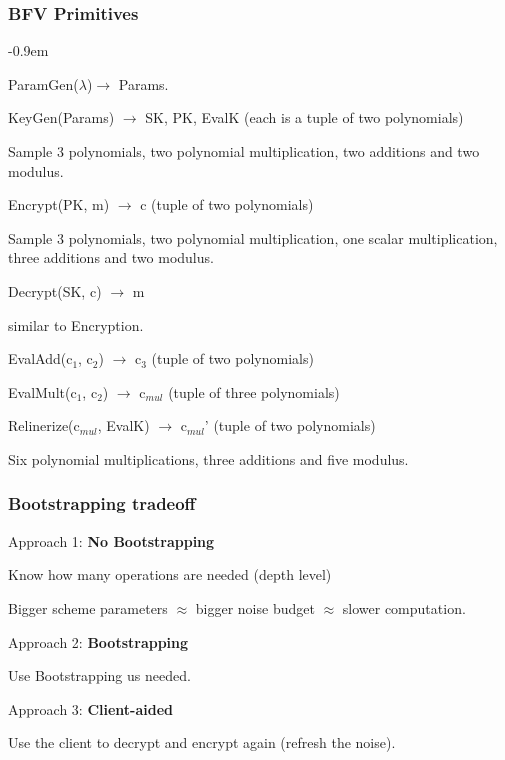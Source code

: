 \documentclass[10pt,handout]{beamer}
\newcommand{\SubItem}[1]{
    {\setlength\itemindent{15pt} \item[-] #1}
}
\begin{document}
\begin{frame}
\frametitle{BFV Primitives}

\begin{itemize}\itemsep-0.9em
    \item ParamGen($\lambda$)$\rightarrow$ Params.
    \item KeyGen(Params) $\rightarrow$ SK, PK, EvalK (each is a tuple of two polynomials)
        \SubItem{ Sample 3 polynomials, two polynomial multiplication, two additions and two modulus.}
\pause
    \item Encrypt(PK, m) $\rightarrow$ c (tuple of two polynomials)
        \SubItem{ Sample 3 polynomials, two polynomial multiplication, one scalar multiplication, three additions and two modulus.}
    \item Decrypt(SK, c) $\rightarrow$ m
        \SubItem{ similar to Encryption.}
\pause
    \item EvalAdd(c$_1$, c$_2$) $\rightarrow$ c$_3$ (tuple of two polynomials)
    \item EvalMult(c$_1$, c$_2$) $\rightarrow$ c$_{mul}$ (tuple of three polynomials)
\pause
    \item Relinerize(c$_{mul}$, EvalK) $\rightarrow$ c$_{mul}$' (tuple of two polynomials)
        \SubItem{ Six polynomial multiplications, three additions and five modulus.}
\end{itemize}

\end{frame}




\begin{frame}
    \frametitle{Bootstrapping tradeoff}

    Approach 1: \textbf{No Bootstrapping}

    Know how many operations are needed (depth level)

    Bigger scheme parameters $\approx$ bigger noise budget $\approx$ slower computation.

\pause
    Approach 2: \textbf{Bootstrapping}

    Use Bootstrapping us needed.

\pause
    Approach 3: \textbf{Client-aided}

    Use the client to decrypt and encrypt again (refresh the noise).
\end{frame}
\end{document}
